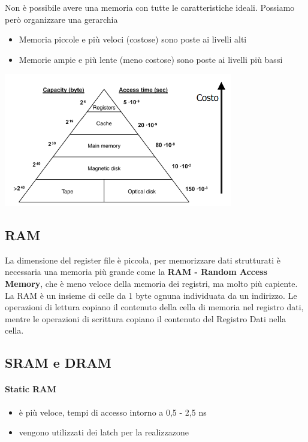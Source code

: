 \documentclass[12pt, a4paper, openany]{book}
\begin{document}
Non è possibile avere una memoria con tutte le caratteristiche ideali.
Possiamo però organizzare una gerarchia
\begin{itemize}
    \item Memoria piccole e più veloci (costose) sono poste ai livelli alti
    \item Memorie ampie e più lente (meno costose) sono poste ai livelli più bassi
\end{itemize}
\begin{center}
    \includegraphics[width=100mm, scale=0.5]{gerarchie_memorie.png}
\end{center}

\subsection*{RAM}
La dimensione del register file è piccola, per memorizzare dati strutturati è 
necessaria una memoria più grande come la \textbf{RAM - Random Access Memory},
che è meno veloce della memoria dei registri, ma molto più capiente.
\\La RAM è un insieme di celle da 1 byte ognuna individuata da un indirizzo.
Le operazioni di lettura copiano il contenuto della cella di memoria nel registro dati,
mentre le operazioni di scrittura copiano il contenuto del Registro Dati nella cella.
\subsection*{SRAM e DRAM}
\paragraph*{Static RAM} \begin{itemize}
    \item è più veloce, tempi di accesso intorno a 0,5 - 2,5 ns
    \item vengono utilizzati dei latch per la realizzazone
\end{itemize}
\end{document}
